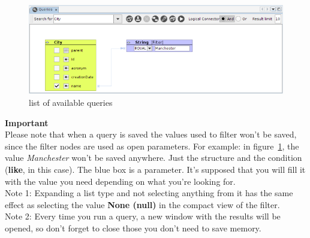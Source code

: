 \documentclass[a4paper]{article}
\begin{document}
	\begin{figure}[h!]
		\centering
		\includegraphics[width=0.7\linewidth]{img/query_filter_value_not_saved.png}
		\caption{list of available queries}
		\label{fig:query_filter_value_not_saved}
	\end{figure}
	
	\begin{framed} {\large \textbf{Important}}\\
		Please note that when a query is saved the values used to filter won't be saved, since the filter nodes are used as open parameters. For example: in figure~\ref{fig:query_filter_value_not_saved}, the value \textit{Manchester} won't be saved anywhere. Just the structure and the condition (\textbf{like}, in this case). The blue box is a parameter. It's supposed that you will fill it with the value you need depending on what you're looking for.
		\\Note 1: Expanding a list type and not selecting anything from it has the same effect as selecting the value \textbf{None (null)} in the compact view of the filter.
		\\Note 2: Every time you run a query, a new window with the results will be opened, so don't forget to close those you don't need to save memory.
	\end{framed}
	
	\clearpage
\end{document}
